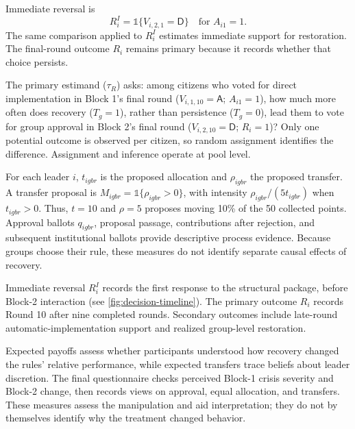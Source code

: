 \documentclass[11pt,a4paper]{article}
\newcommand{\Dproc}{\textsf{D}}
\newcommand{\Aproc}{\textsf{A}}
\newcommand{\ind}[1]{\mathbb{1}\{#1\}}
\begin{document}
Immediate reversal is
\begin{equation}
R_i^{I}=\ind{V_{i,2,1}=\Dproc}\quad\text{for }A_{i1}=1.
\end{equation}
The same comparison applied to \(R_i^{I}\) estimates immediate support for restoration. The final-round outcome \(R_i\) remains primary because it records whether that choice persists.

\begin{plainlanguagebox}
The primary estimand ($\tau_R$) asks: among citizens who voted for direct implementation in Block 1's final round ($V_{i,1,10}=\Aproc$; $A_{i1}=1$), how much more often does recovery ($T_g=1$), rather than persistence ($T_g=0$), lead them to vote for group approval in Block 2's final round ($V_{i,2,10}=\Dproc$; $R_i=1$)? Only one potential outcome is observed per citizen, so random assignment identifies the difference. Assignment and inference operate at pool level.
\end{plainlanguagebox}

For each leader $i$, $t_{igbr}$ is the proposed allocation and $\rho_{igbr}$ the proposed transfer. A transfer proposal is $M_{igbr}=\ind{\rho_{igbr}>0}$, with intensity $\rho_{igbr}/(5t_{igbr})$ when $t_{igbr}>0$. Thus, $t=10$ and $\rho=5$ proposes moving 10\% of the 50 collected points. Approval ballots $q_{igbr}$, proposal passage, contributions after rejection, and subsequent institutional ballots provide descriptive process evidence. Because groups choose their rule, these measures do not identify separate causal effects of recovery.

Immediate reversal \(R_i^{I}\) records the first response to the structural package, before Block-2 interaction (see \autoref{fig:decision-timeline}). The primary outcome \(R_i\) records Round 10 after nine completed rounds. Secondary outcomes include late-round automatic-implementation support and realized group-level restoration.

Expected payoffs assess whether participants understood how recovery changed the rules' relative performance, while expected transfers trace beliefs about leader discretion. The final questionnaire checks perceived Block-1 crisis severity and Block-2 change, then records views on approval, equal allocation, and transfers. These measures assess the manipulation and aid interpretation; they do not by themselves identify why the treatment changed behavior.
\end{document}

